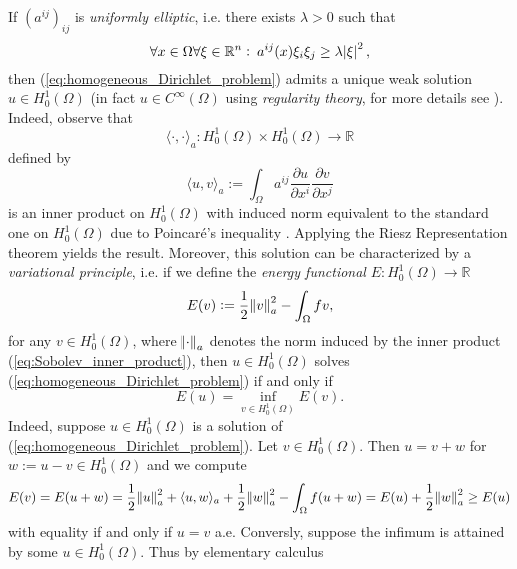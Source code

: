 If $(a^{ij})_{ij}$ is \emph{uniformly elliptic}, i.e. there exists $\lambda > 0$ such that
\begin{equation*}
	\forall x \in \Omega\forall \xi \in \mathbb{R}^n : \> a^{ij}(x)\xi_i\xi_j \geq \lambda \abs{\xi}^2,	
\end{equation*}
\noindent then (\ref{eq:homogeneous_Dirichlet_problem}) admits a unique weak solution $u \in H^1_0(\Omega)$ (in fact $u \in C^\infty(\Omega)$ using \emph{regularity theory}, for more details see \cite[175]{struwe:fa:2014}). Indeed, observe that 
\begin{equation*}
	\langle \cdot,\cdot \rangle_a : H^1_0(\Omega) \times H^1_0(\Omega) \to \mathbb{R}
\end{equation*}
\noindent defined by
\begin{equation}
	\label{eq:Sobolev_inner_product}
	\langle u, v \rangle_a := \int_\Omega a^{ij} \frac{\partial u}{\partial x^i}\frac{\partial v}{\partial x^j}
\end{equation}
\noindent is an inner product on $H^1_0(\Omega)$ with induced norm equivalent to the standard one on $H^1_0(\Omega)$ due to Poincar\'e's inequality \cite[107]{struwe:fa:2014}. Applying the Riesz Representation theorem \cite[49--50]{struwe:fa:2014} yields the result. Moreover, this solution can be characterized by a \emph{variational principle}, i.e. if we define the \emph{energy functional} $E : H^1_0(\Omega) \to \mathbb{R}$
\begin{equation*}
	E(v) := \frac{1}{2} \norm{v}^2_a - \int_\Omega fv,
\end{equation*}
\noindent for any $v \in H^1_0(\Omega)$, where $\norm{\cdot}_a$ denotes the norm induced by the inner product (\ref{eq:Sobolev_inner_product}), then $u \in H^1_0(\Omega)$ solves (\ref{eq:homogeneous_Dirichlet_problem}) if and only if
\begin{equation}
	\label{eq:variational_formulation}
	E(u) = \inf_{v \in H^1_0(\Omega)}E(v).
\end{equation}
Indeed, suppose $u \in H^1_0(\Omega)$ is a solution of (\ref{eq:homogeneous_Dirichlet_problem}). Let $v \in H^1_0(\Omega)$. Then $u = v + w$ for $w := u - v \in H^1_0(\Omega)$ and we compute
\begin{equation*}
	E(v) = E(u + w) = \frac{1}{2}\norm{u}^2_a + \langle u,w \rangle_a + \frac{1}{2}\norm{w}^2_a - \int_\Omega f(u + w) = E(u) + \frac{1}{2}\norm{w}^2_a \geq E(u)
\end{equation*}
\noindent with equality if and only if $u = v$ a.e. Conversly, suppose the infimum is attained by some $u \in H^1_0(\Omega)$. Thus by elementary calculus
